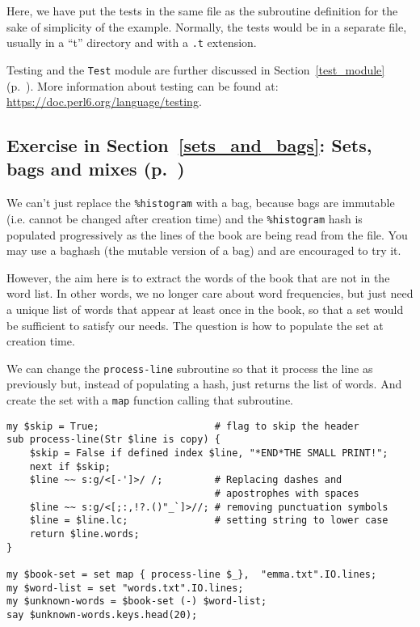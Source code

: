 Here, we have put the tests in the same file as the subroutine 
definition for the sake of simplicity of the example. Normally, 
the tests would be in a separate file, usually in a ``t'' 
directory and with a \verb'.t' extension.

Testing and the {\tt Test} module are further discussed  
in Section~\ref{test_module} (p.~\pageref{test_module}).
More information about testing can be found at: 
\url{https://doc.perl6.org/language/testing}.

\subsection{Exercise in Section~\ref{sets_and_bags}: Sets, bags and mixes (p.~\pageref{diff_with_set})}
\label{sol_diff_with_set}

We can't just replace the \verb'%histogram' with a bag, because 
bags are immutable (i.e. cannot be changed after creation time) 
and the \verb'%histogram' hash is populated progressively as 
the lines of the book are being read from the file. You may use 
a baghash (the mutable version of a bag) and are encouraged 
to try it.

However, the aim here is to extract the words of the book that 
are not in the word list. In other words, we no longer care 
about word frequencies, but just need a unique list of words 
that appear at least once in the book, so that a set would 
be sufficient to satisfy our needs. The question is how to 
populate the set at creation time.

We can change the {\tt process-line} subroutine so that it 
process the line as previously but, instead of populating a 
hash, just returns the list of words. And create the set 
with a {\tt map} function calling that subroutine.

\begin{verbatim}
my $skip = True;                    # flag to skip the header
sub process-line(Str $line is copy) {
    $skip = False if defined index $line, "*END*THE SMALL PRINT!";
    next if $skip;
    $line ~~ s:g/<[-']>/ /;         # Replacing dashes and 
                                    # apostrophes with spaces
    $line ~~ s:g/<[;:,!?.()"_`]>//; # removing punctuation symbols
    $line = $line.lc;               # setting string to lower case
    return $line.words;
}

my $book-set = set map { process-line $_},  "emma.txt".IO.lines; 
my $word-list = set "words.txt".IO.lines;
my $unknown-words = $book-set (-) $word-list;
say $unknown-words.keys.head(20);
\end{verbatim}

